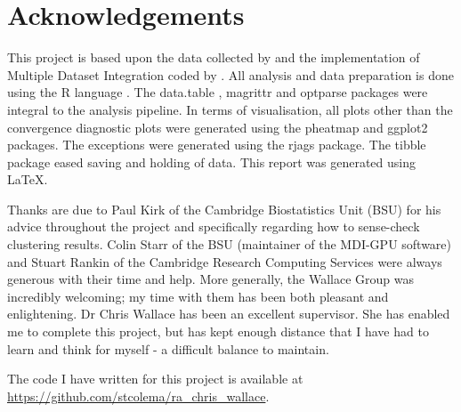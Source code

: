 \documentclass[12pt]{article} %
\begin{document}
\begin{abstract}
			\end{abstract}
		\vspace*{\fill}	
	
	\newpage
	
	\section*{Acknowledgements}
	This project is based upon the data collected by \citet{TheInternationalIBDGeneticsConsortiumIBDriskloci2018} and the implementation of Multiple Dataset Integration coded by \citet{MasonMDIGPUacceleratingintegrative2016a}. All analysis and data preparation is done using the R language \citep{RCoreTeamLanguageEnvironmentStatistical2018}. The data.table \citep{DowleData.Table2019}, magrittr \citep{BacheMagrittr2014} and optparse \citep{DavisOptparse2019} packages were integral to the analysis pipeline. In terms of visualisation, all plots other than the convergence diagnostic plots were generated using the pheatmap \citep{KoldepheatmapPrettyHeatmaps2018} and ggplot2 \citep{WickhamGgplot22016} packages. The exceptions were generated using the rjags \citep{PlummerRjags2018} package. The tibble \citep{MullerTibble2019} package eased saving and holding of data. This report was generated using \LaTeX.
	
	Thanks are due to Paul Kirk of the Cambridge Biostatistics Unit (BSU) for his advice throughout the project and specifically regarding how to sense-check clustering results. Colin Starr of the BSU (maintainer of the MDI-GPU software) and Stuart Rankin of the Cambridge Research Computing Services were always generous with their time and help. More generally, the Wallace Group was incredibly welcoming; my time with them has been both pleasant and enlightening. Dr Chris Wallace has been an excellent supervisor. She has enabled me to complete this project, but has kept enough distance that I have had to learn and think for myself - a difficult balance to maintain.
	
	The code I have written for this project is available at \url{https://github.com/stcolema/ra_chris_wallace}.
	
	\newpage
	
	\tableofcontents
	
\end{document}
